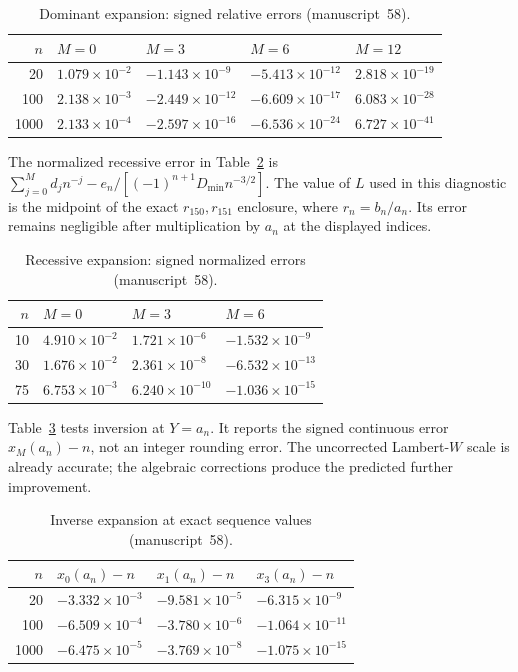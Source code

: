 \documentclass[11pt,letterpaper]{article}
\theoremstyle{remark}\newtheorem{remark}[theorem]{Remark}
\newcounter{l7gtrsavedeq}
\begin{document}
\begin{table}[htbp]\centering\small
\caption{Dominant expansion: signed relative errors (manuscript~58).}\label{l7g:tab:dominant}
\begin{tabular}{rllll}\toprule
$n$ & $M=0$ & $M=3$ & $M=6$ & $M=12$\\\midrule
20 & $1.079\times10^{-2}$ & $-1.143\times10^{-9}$ & $-5.413\times10^{-12}$ & $2.818\times10^{-19}$\\
100 & $2.138\times10^{-3}$ & $-2.449\times10^{-12}$ & $-6.609\times10^{-17}$ & $6.083\times10^{-28}$\\
1000 & $2.133\times10^{-4}$ & $-2.597\times10^{-16}$ & $-6.536\times10^{-24}$ & $6.727\times10^{-41}$\\
\bottomrule\end{tabular}\end{table}

The normalized recessive error in Table~\ref{l7g:tab:minimal} is
$\sum_{j=0}^{M}d_jn^{-j}-e_n/[(-1)^{n+1}D_{\min}n^{-3/2}]$.
The value of $L$ used in this diagnostic is the midpoint of the exact
$r_{150},r_{151}$ enclosure, where $r_n=b_n/a_n$. Its error remains
negligible after multiplication by $a_n$ at the displayed indices.

\begin{table}[htbp]\centering\small
\caption{Recessive expansion: signed normalized errors (manuscript~58).}\label{l7g:tab:minimal}
\begin{tabular}{rlll}\toprule
$n$ & $M=0$ & $M=3$ & $M=6$\\\midrule
10 & $4.910\times10^{-2}$ & $1.721\times10^{-6}$ & $-1.532\times10^{-9}$\\
30 & $1.676\times10^{-2}$ & $2.361\times10^{-8}$ & $-6.532\times10^{-13}$\\
75 & $6.753\times10^{-3}$ & $6.240\times10^{-10}$ & $-1.036\times10^{-15}$\\
\bottomrule\end{tabular}\end{table}

Table~\ref{l7g:tab:inverse} tests inversion at $Y=a_n$. It reports the signed
continuous error $x_M(a_n)-n$, not an integer rounding error. The
uncorrected Lambert-$W$ scale is already accurate; the algebraic
corrections produce the predicted further improvement.

\begin{table}[htbp]\centering\small
\caption{Inverse expansion at exact sequence values (manuscript~58).}\label{l7g:tab:inverse}
\begin{tabular}{rlll}\toprule
$n$ & $x_0(a_n)-n$ & $x_1(a_n)-n$ & $x_3(a_n)-n$\\\midrule
20 & $-3.332\times10^{-3}$ & $-9.581\times10^{-5}$ & $-6.315\times10^{-9}$\\
100 & $-6.509\times10^{-4}$ & $-3.780\times10^{-6}$ & $-1.064\times10^{-11}$\\
1000 & $-6.475\times10^{-5}$ & $-3.769\times10^{-8}$ & $-1.075\times10^{-15}$\\
\bottomrule\end{tabular}\end{table}
\end{document}
